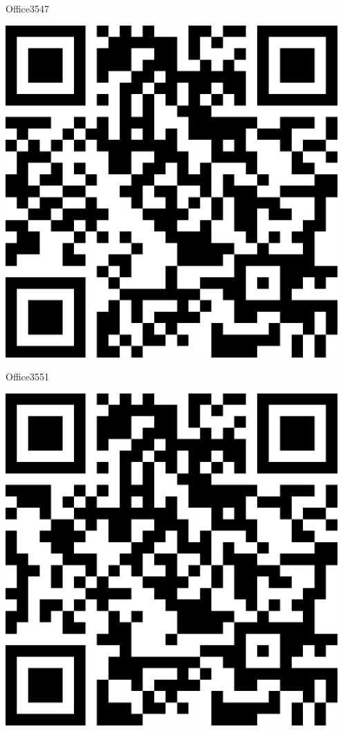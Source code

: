 \documentclass[letterpaper]{article}
\begin{document}
 \hfill{\small Office3547} 

 \vspace{1in} 
 \pagebreak 
{} 
 \vspace*{\fill} 
 \begingroup 
 \centerline{\includegraphics[scale=1,width=5in,height=5in]{Office3551.png}} 
 \endgroup 
 \vspace*{\fill} 

 \hfill{\small Office3551} 

 \vspace{1in} 
 \pagebreak 
{} 
 \vspace*{\fill} 
 \begingroup 
 \centerline{\includegraphics[scale=1,width=5in,height=5in]{Office3555.png}} 
 \endgroup 
 \vspace*{\fill} 
\end{document}
